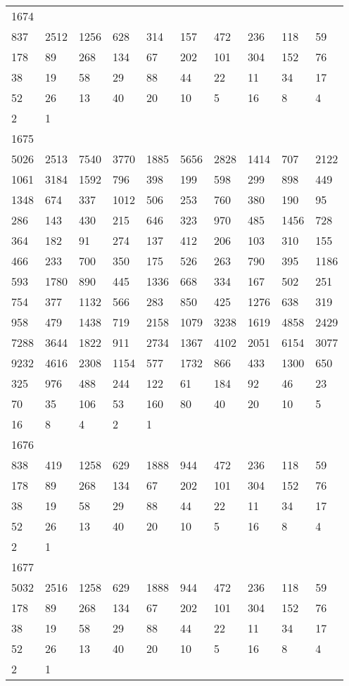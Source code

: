 \begin{longtable}{*{10}{l}}
1674&&&&&&&&&\\
837& 2512& 1256& 628& 314& 157& 472& 236& 118& 59\\
178& 89& 268& 134& 67& 202& 101& 304& 152& 76\\
38& 19& 58& 29& 88& 44& 22& 11& 34& 17\\
52& 26& 13& 40& 20& 10& 5& 16& 8& 4\\
2& 1& \\

1675&&&&&&&&&\\
5026& 2513& 7540& 3770& 1885& 5656& 2828& 1414& 707& 2122\\
1061& 3184& 1592& 796& 398& 199& 598& 299& 898& 449\\
1348& 674& 337& 1012& 506& 253& 760& 380& 190& 95\\
286& 143& 430& 215& 646& 323& 970& 485& 1456& 728\\
364& 182& 91& 274& 137& 412& 206& 103& 310& 155\\
466& 233& 700& 350& 175& 526& 263& 790& 395& 1186\\
593& 1780& 890& 445& 1336& 668& 334& 167& 502& 251\\
754& 377& 1132& 566& 283& 850& 425& 1276& 638& 319\\
958& 479& 1438& 719& 2158& 1079& 3238& 1619& 4858& 2429\\
7288& 3644& 1822& 911& 2734& 1367& 4102& 2051& 6154& 3077\\
9232& 4616& 2308& 1154& 577& 1732& 866& 433& 1300& 650\\
325& 976& 488& 244& 122& 61& 184& 92& 46& 23\\
70& 35& 106& 53& 160& 80& 40& 20& 10& 5\\
16& 8& 4& 2& 1& \\

1676&&&&&&&&&\\
838& 419& 1258& 629& 1888& 944& 472& 236& 118& 59\\
178& 89& 268& 134& 67& 202& 101& 304& 152& 76\\
38& 19& 58& 29& 88& 44& 22& 11& 34& 17\\
52& 26& 13& 40& 20& 10& 5& 16& 8& 4\\
2& 1& \\

1677&&&&&&&&&\\
5032& 2516& 1258& 629& 1888& 944& 472& 236& 118& 59\\
178& 89& 268& 134& 67& 202& 101& 304& 152& 76\\
38& 19& 58& 29& 88& 44& 22& 11& 34& 17\\
52& 26& 13& 40& 20& 10& 5& 16& 8& 4\\
2& 1& \\


\end{longtable}
